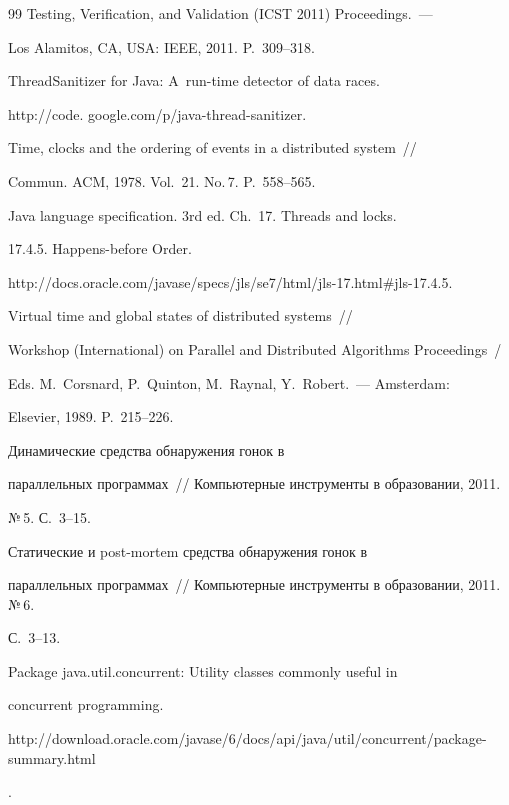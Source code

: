 {{\begin{thebibliography}{99}
Testing, Verification, and Validation (ICST 2011) Proceedings.~---

Los Alamitos, CA, USA: IEEE, 2011. P.~309--318.








ThreadSanitizer for Java: A~run-time detector of data races.

{\sf http://code. google.com/p/java-thread-sanitizer}.


 Time, clocks and the ordering of events in a distributed system~/\!\!/

Commun. ACM, 1978. Vol.~21. No.\,7. P.~558--565.


Java language specification. 3rd ed. Ch.~17. Threads and locks.

17.4.5. Happens-before Order.

{\sf http://docs.oracle.com/javase/specs/jls/se7/html/jls-17.html\#jls-17.4.5}.


 Virtual time and global states of distributed systems~/\!\!/

 Workshop (International) on Parallel and Distributed Algorithms Proceedings~/

Eds.  M.~Corsnard, P.~Quinton, M.~Raynal, Y.~Robert.~--- Amsterdam:

Elsevier, 1989. P.~215--226.






 Динамические средства обнаружения гонок в

параллельных программах~/\!\!/ Компьютерные инструменты в образовании, 2011.

№\,5. С.~3--15.





Статические и post-mortem средства обнаружения гонок в

параллельных программах~/\!\!/ Компьютерные инструменты в образовании, 2011. №\,6.

С.~3--13.






Package java.util.concurrent: Utility classes commonly useful in

concurrent programming.

{\sf

http://download.oracle.com/javase/6/docs/api/java/util/concurrent/\linebreak package-summary.html}.



\end{thebibliography}

}

}
